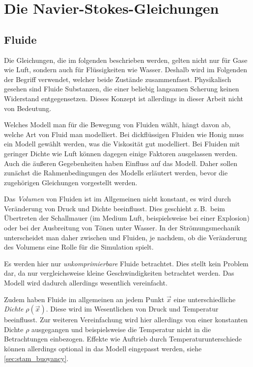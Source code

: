 \section{Die Navier-Stokes-Gleichungen}
\label{sec:navier_stokes}

\subsection{Fluide}

Die Gleichungen, die im folgenden beschrieben werden, gelten nicht nur
für Gase wie Luft, sondern auch für Flüssigkeiten wie Wasser. Deshalb
wird im Folgenden der Begriff  verwendet,
welcher beide Zustände zusammenfasst. Physikalisch gesehen sind
Fluide Substanzen, die einer beliebig langsamen Scherung keinen
Widerstand entgegensetzen. Dieses Konzept ist allerdings in dieser
Arbeit nicht von Bedeutung.

Welches Modell man für die Bewegung von Fluiden wählt, hängt davon ab,
welche Art von Fluid man modelliert. Bei dickflüssigen Fluiden wie
Honig muss ein Modell gewählt werden, was die Viskosität gut
modelliert. Bei Fluiden mit geringer Dichte wie Luft können dagegen
einige Faktoren ausgelassen werden. Auch die äußeren Gegebenheiten
haben Einfluss auf das Modell. Daher sollen zunächst die
Rahmenbedingungen des Modells erläutert werden, bevor die zugehörigen
Gleichungen vorgestellt werden.

Das \emph{Volumen} von Fluiden ist im Allgemeinen nicht konstant, es
wird durch Veränderung von Druck und Dichte beeinflusst. Dies
geschieht z.\,B.\ beim Übertreten der Schallmauer (im Medium Luft,
beispielsweise bei einer Explosion) oder bei der Ausbreitung von Tönen
unter Wasser. In der Strömungsmechanik unterscheidet man daher
zwischen  und
 Fluiden, je nachdem, ob die
Veränderung des Volumens eine Rolle für die Simulation spielt.

Es werden hier nur \emph{unkomprimierbare} Fluide betrachtet. Dies
stellt kein Problem dar, da nur vergleichsweise kleine
Geschwindigkeiten betrachtet werden.  Das Modell wird dadurch
allerdings wesentlich vereinfacht.

Zudem haben Fluide im allgemeinen an jedem Punkt $\vec{x}$ eine
unterschiedliche \emph{Dichte} $\rho(\vec{x})$. Diese wird im
Wesentlichen von Druck und Temperatur beeinflusst. Zur weiteren
Vereinfachung wird hier allerdings von einer konstanten Dichte $\rho$
ausgegangen und beispielsweise die Temperatur nicht in die
Betrachtungen einbezogen. Effekte wie Auftrieb durch
Temperaturunterschiede können allerdings optional in das Modell
eingepasst werden, siehe \autoref{sec:stam_buoyancy}.

